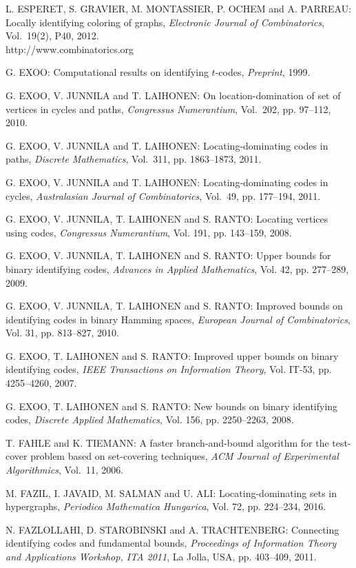 \begin{thebibliography}{999}
L. ESPERET, S. GRAVIER, M. MONTASSIER, P. OCHEM and A. PARREAU: Locally identifying coloring of graphs, {\it Electronic Journal of Combinatorics}, Vol.~19(2), P40, 2012.\\
http://www.combinatorics.org

G. EXOO: Computational results on identifying $t$-codes, {\it Preprint}, 1999.

G. EXOO, V. JUNNILA and T. LAIHONEN: On location-domination of set of vertices in cycles and paths, {\it Congressus Numerantium}, Vol.~202, pp. 97--112, 2010.

G. EXOO, V. JUNNILA and T. LAIHONEN: Locating-dominating codes in paths, {\it Discrete Mathematics}, Vol.~311, pp. 1863--1873, 2011.

G. EXOO, V. JUNNILA and T. LAIHONEN: Locating-dominating codes in cycles, {\it Australasian Journal of Combinatorics}, Vol.~49, pp. 177--194, 2011.

G. EXOO, V. JUNNILA, T. LAIHONEN and S. RANTO: Locating vertices using codes, {\it Congressus Numerantium}, Vol. 191, pp. 143--159, 2008.

G. EXOO, V. JUNNILA, T. LAIHONEN and S. RANTO: Upper bounds for binary identifying codes, {\it Advances in Applied Mathematics}, Vol. 42, pp. 277--289, 2009.

G. EXOO, V. JUNNILA, T. LAIHONEN and S. RANTO: Improved bounds on identifying codes in binary Hamming spaces, {\it European Journal of Combinatorics}, Vol. 31, pp. 813--827, 2010.

G. EXOO, T. LAIHONEN and S. RANTO: Improved upper bounds on binary identifying codes, {\it IEEE Transactions on Information Theory}, Vol. IT-53, pp. 4255--4260, 2007.

G. EXOO, T. LAIHONEN and S. RANTO: New bounds on binary identifying codes, {\it Discrete Applied Mathematics}, Vol. 156, pp. 2250--2263, 2008.

T. FAHLE and K. TIEMANN: A faster branch-and-bound algorithm for the test-cover problem based on set-covering techniques, {\it ACM Journal of Experimental Algorithmics}, Vol.~11, 2006.

M. FAZIL, I. JAVAID, M. SALMAN and U. ALI: Locating-dominating sets in hypergraphs, {\it Periodica Mathematica Hungarica}, Vol. 72,  pp. 224--234, 2016.

N. FAZLOLLAHI, D. STAROBINSKI and A. TRACHTENBERG: Connecting identifying codes and fundamental bounds, {\it Proceedings of Information Theory and Applications Workshop, ITA 2011}, La Jolla, USA, pp. 403--409, 2011.


\end{thebibliography}
